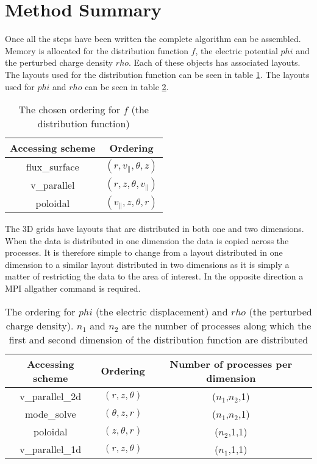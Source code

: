 
\section{Method Summary}

Once all the steps have been written the complete algorithm can be assembled. Memory is allocated for the distribution function $f$, the electric potential $phi$ and the perturbed charge density $rho$. Each of these objects has associated layouts. The layouts used for the distribution function can be seen in table \ref{tab::Ordering f}. The layouts used for $phi$ and $rho$ can be seen in table \ref{tab::Ordering phi}.

\begin{table}[ht]
\centering
 \begin{tabular}{|c|c|}
  \hline
  Accessing scheme & Ordering\\
  \hline
  flux\_surface & $(r,v_\parallel,\theta,z)$\\
  \hline
  v\_parallel & $(r,z,\theta,v_\parallel)$\\
  \hline
  poloidal & $(v_\parallel,z,\theta,r)$\\
  \hline
 \end{tabular}
 \caption{\label{tab::Ordering f} The chosen ordering for $f$ (the distribution function)}
\end{table}

The 3D grids have layouts that are distributed in both one and two dimensions. When the data is distributed in one dimension the data is copied across the processes. It is therefore simple to change from a layout distributed in one dimension to a similar layout distributed in two dimensions as it is simply a matter of restricting the data to the area of interest. In the opposite direction a MPI allgather command is required.

\begin{table}[ht]
\centering
 \begin{tabular}{|c|c|c|}
  \hline
  Accessing scheme & Ordering & Number of processes per dimension\\
  \hline
  v\_parallel\_2d & $(r,z,\theta)$ & ($n_1$,$n_2$,1)\\
  \hline
  mode\_solve & $(\theta,z,r)$ & ($n_1$,$n_2$,1)\\
  \hline
  poloidal & $(z,\theta,r)$ & ($n_2$,1,1)\\
  \hline
  v\_parallel\_1d & $(r,z,\theta)$ & ($n_1$,1,1)\\
  \hline
 \end{tabular}
 \caption{\label{tab::Ordering phi} The ordering for $phi$ (the electric displacement) and $rho$ (the perturbed charge density). $n_1$ and $n_2$ are the number of processes along which the first and second dimension of the distribution function are distributed}
\end{table}

